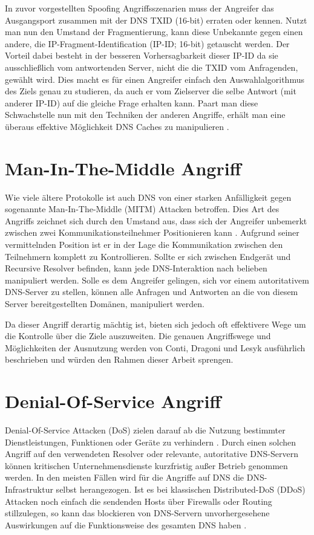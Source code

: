 In zuvor vorgestellten Spoofing Angriffsszenarien muss der Angreifer das Ausgangsport zusammen mit der DNS TXID (16-bit) erraten oder kennen. Nutzt man nun den Umstand der Fragmentierung, kann diese Unbekannte gegen einen andere, die IP-Fragment-Identification (IP-ID; 16-bit) getauscht werden. Der Vorteil dabei besteht in der besseren Vorhersagbarkeit dieser IP-ID da sie ausschließlich vom antwortenden Server, nicht die die TXID vom Anfragenden, gewählt wird. Dies macht es für einen Angreifer einfach den Auswahlalgorithmus des Ziels genau zu studieren, da auch er vom Zielserver die selbe Antwort (mit anderer IP-ID) auf die gleiche Frage erhalten kann. Paart man diese Schwachstelle nun mit den Techniken der anderen Angriffe, erhält man eine überaus effektive Möglichkeit DNS Caches zu manipulieren \cite{Herzberg2013}.

\section{Man-In-The-Middle Angriff}
Wie viele ältere Protokolle ist auch DNS von einer starken Anfälligkeit gegen sogenannte Man-In-The-Middle (MITM) Attacken betroffen. Dies Art des Angriffs zeichnet sich durch den Umstand aus, dass sich der Angreifer unbemerkt zwischen zwei Kommunikationsteilnehmer Positionieren kann \cite{CAPEC94}. Aufgrund seiner vermittelnden Position ist er in der Lage die Kommunikation zwischen den Teilnehmern komplett zu Kontrollieren. Sollte er sich zwischen Endgerät und Recursive Resolver befinden, kann jede DNS-Interaktion nach belieben manipuliert werden. Solle es dem Angreifer gelingen, sich vor einem autoritativem DNS-Server zu stellen, können alle Anfragen und Antworten an die von diesem Server bereitgestellten Domänen, manipuliert werden. 

Da dieser Angriff derartig mächtig ist, bieten sich jedoch oft effektivere Wege um die Kontrolle über die Ziele auszuweiten. Die genauen Angriffswege und Möglichkeiten der Ausnutzung werden von Conti, Dragoni und Lesyk \cite{Conti2016} ausführlich beschrieben und würden den Rahmen dieser Arbeit sprengen.

\section{Denial-Of-Service Angriff}
Denial-Of-Service Attacken (DoS) zielen darauf ab die Nutzung bestimmter Dienstleistungen, Funktionen oder Geräte zu verhindern \cite{BSIG040}. Durch einen solchen Angriff auf den verwendeten Resolver oder relevante, autoritative DNS-Servern können kritischen Unternehmensdienste kurzfristig außer Betrieb genommen werden. In den meisten Fällen wird für die Angriffe auf DNS die DNS-Infrastruktur selbst herangezogen. Ist es bei klassischen Distributed-DoS (DDoS) Attacken noch einfach die sendenden Hosts über Firewalls oder Routing stillzulegen, so kann das blockieren von DNS-Servern unvorhergesehene Auswirkungen auf die Funktionsweise des gesamten DNS haben \cite{Kambourakis2008}. 

